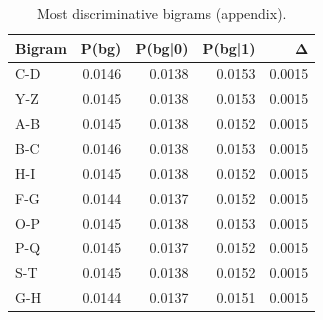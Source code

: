 \begin{table}
\caption{Most discriminative bigrams (appendix).}
\label{tab:top_bigrams}
\begin{tabular}{lrrrr}
\toprule
Bigram & P(bg) & P(bg|0) & P(bg|1) & Δ \\
\midrule
C-D & 0.0146 & 0.0138 & 0.0153 & 0.0015 \\
Y-Z & 0.0145 & 0.0138 & 0.0153 & 0.0015 \\
A-B & 0.0145 & 0.0138 & 0.0152 & 0.0015 \\
B-C & 0.0146 & 0.0138 & 0.0153 & 0.0015 \\
H-I & 0.0145 & 0.0138 & 0.0152 & 0.0015 \\
F-G & 0.0144 & 0.0137 & 0.0152 & 0.0015 \\
O-P & 0.0145 & 0.0138 & 0.0153 & 0.0015 \\
P-Q & 0.0145 & 0.0137 & 0.0152 & 0.0015 \\
S-T & 0.0145 & 0.0138 & 0.0152 & 0.0015 \\
G-H & 0.0144 & 0.0137 & 0.0151 & 0.0015 \\
\bottomrule
\end{tabular}
\end{table}
